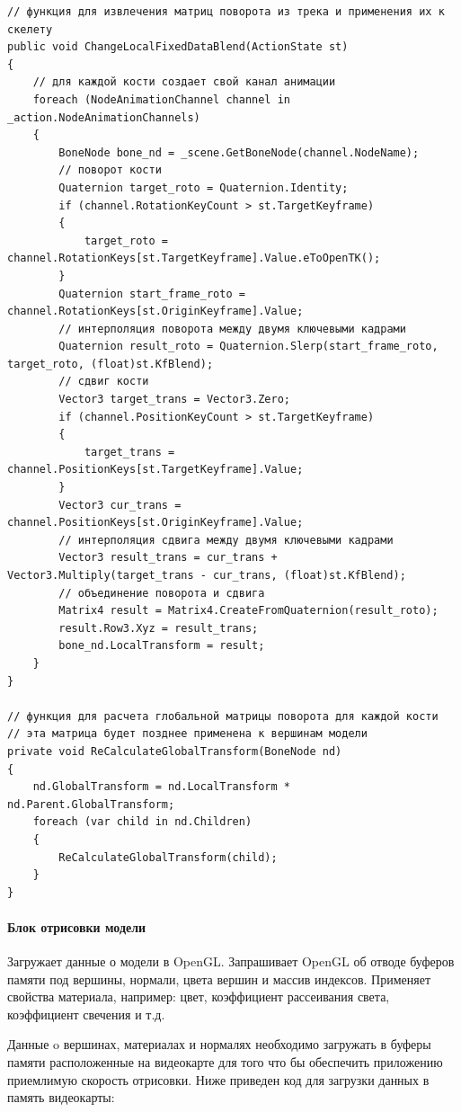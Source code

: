 \begin{verbatim}
// функция для извлечения матриц поворота из трека и применения их к скелету
public void ChangeLocalFixedDataBlend(ActionState st)
{
    // для каждой кости создает свой канал анимации    
    foreach (NodeAnimationChannel channel in _action.NodeAnimationChannels)
    {
        BoneNode bone_nd = _scene.GetBoneNode(channel.NodeName);
        // поворот кости
        Quaternion target_roto = Quaternion.Identity;
        if (channel.RotationKeyCount > st.TargetKeyframe)
        {
            target_roto = channel.RotationKeys[st.TargetKeyframe].Value.eToOpenTK();
        }
        Quaternion start_frame_roto = channel.RotationKeys[st.OriginKeyframe].Value;
        // интерполяция поворота между двумя ключевыми кадрами
        Quaternion result_roto = Quaternion.Slerp(start_frame_roto, target_roto, (float)st.KfBlend);
        // сдвиг кости
        Vector3 target_trans = Vector3.Zero;
        if (channel.PositionKeyCount > st.TargetKeyframe)
        {
            target_trans = channel.PositionKeys[st.TargetKeyframe].Value;
        }
        Vector3 cur_trans = channel.PositionKeys[st.OriginKeyframe].Value;
        // интерполяция сдвига между двумя ключевыми кадрами
        Vector3 result_trans = cur_trans + Vector3.Multiply(target_trans - cur_trans, (float)st.KfBlend);
        // объединение поворота и сдвига
        Matrix4 result = Matrix4.CreateFromQuaternion(result_roto);
        result.Row3.Xyz = result_trans;
        bone_nd.LocalTransform = result;
    }
}

// функция для расчета глобальной матрицы поворота для каждой кости
// эта матрица будет позднее применена к вершинам модели
private void ReCalculateGlobalTransform(BoneNode nd)
{
    nd.GlobalTransform = nd.LocalTransform * nd.Parent.GlobalTransform;
    foreach (var child in nd.Children)
    {
        ReCalculateGlobalTransform(child);
    }
}
\end{verbatim}



\paragraph{Блок отрисовки модели}
Загружает данные о модели в OpenGL.
Запрашивает OpenGL об отводе буферов памяти под вершины, нормали, цвета вершин и массив индексов. Применяет свойства материала, например: цвет, коэффициент рассеивания света, коэффициент свечения и т.д.

Данные o вершинах, материалах и нормалях необходимо загружать в буферы памяти расположенные на видеокарте для того что бы обеспечить приложению приемлимую скорость отрисовки.
Ниже приведен код для загрузки данных в память видеокарты:

